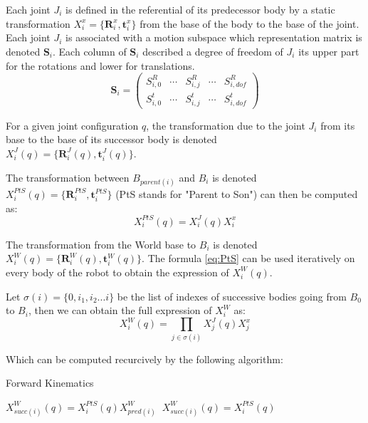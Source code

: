 Each joint $J_i$ is defined in the referential of its predecessor body by a static transformation $X^x_i = \{\mathbf{R}^x_i, \mathbf{t}^x_i\}$ from the base of the body to the base of the joint.
Each joint $J_i$ is associated with a motion subspace which representation matrix is denoted $\mathbf{S}_i$. Each column of $\mathbf{S}_i$ described a degree of freedom of $J_i$ its upper part for the rotations and lower for translations.
\begin{equation}
  \mathbf{S}_i =
  \begin{pmatrix}
    S^R_{i,0} & \cdots &
    S^R_{i,j} & \cdots &
    S^R_{i,dof} \\
    S^t_{i,0} & \cdots &
    S^t_{i,j} & \cdots &
    S^t_{i,dof}
  \end{pmatrix}
\end{equation}

For a given joint configuration $q$, the transformation due to the joint $J_i$ from its base to the base of its successor body is denoted \\$X^J_i(q) = \{\mathbf{R}^J_i(q), \mathbf{t}^J_i(q)\}$.

The transformation between $B_{parent(i)}$ and $B_i$ is denoted $X^{PtS}_i(q) = \{\mathbf{R}^{PtS}_i, \mathbf{t}^{PtS}_i\}$ (PtS stands for "Parent to Son") can then be computed as:
\begin{equation}
  X^{PtS}_i(q) = X^J_i(q) X^x_i
  \label{eq:PtS}
\end{equation}

The transformation from the World base to $B_i$ is denoted \\ $X^W_i(q) = \{\mathbf{R}^W_i(q), \mathbf{t}^W_i(q)\}$.
The formula \ref{eq:PtS} can be used iteratively on every body of the robot to obtain the expression of $X^W_i(q)$.

Let $\sigma(i) =\{0, i_1, i_2 ... i\}$ be the list of indexes of successive bodies going from $B_0$ to $B_i$, then we can obtain the full expression of $X^W_i$ as:
\begin{equation}
  X^{W}_i(q) = \prod_{j\in\sigma(i)}X^J_j(q) X^x_j
\end{equation}

Which can be computed recurcively by the following algorithm:

\begin{algorithm}
  \caption{Forward Kinematics}
  \label{FK}
\begin{algorithmic}
   $X^W_{succ(i)}(q) = X^{PtS}_i(q)X^W_{pred(i)}$
  \Else $\ X^W_{succ(i)}(q) = X^{PtS}_i(q)$
  \EndIf
  \EndFor
\end{algorithmic}
\end{algorithm}

